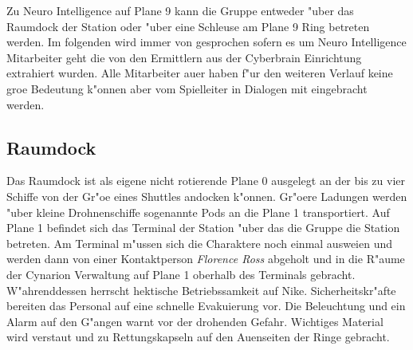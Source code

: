 






























Zu Neuro Intelligence auf Plane 9 kann die Gruppe entweder "uber das Raumdock der Station oder "uber eine Schleuse am Plane 9 Ring betreten werden. Im folgenden wird immer von \ml{} gesprochen sofern es um Neuro Intelligence Mitarbeiter geht die von den Ermittlern aus der Cyberbrain Einrichtung extrahiert wurden. Alle Mitarbeiter au\3er \ml{} haben f"ur den weiteren Verlauf keine gro\3e Bedeutung k"onnen aber vom Spielleiter in Dialogen mit eingebracht werden.

\subsection{Raumdock}
Das Raumdock ist als eigene nicht rotierende Plane 0 ausgelegt an der bis zu vier Schiffe von der Gr"o\3e eines Shuttles andocken k"onnen. Gr"o\3ere Ladungen werden "uber kleine Drohnenschiffe sogenannte Pods an die Plane 1 transportiert. Auf Plane 1 befindet sich das Terminal der Station "uber das die Gruppe die Station betreten. Am Terminal m"ussen sich die Charaktere noch einmal auswei\3en und werden dann von einer Kontaktperson \emph{Florence Ross} abgeholt und in die R"aume der Cynarion Verwaltung auf Plane 1 oberhalb des Terminals gebracht. W"ahrenddessen herrscht hektische Betriebssamkeit auf Nike. Sicherheitskr"afte bereiten das Personal auf eine schnelle Evakuierung vor. Die Beleuchtung und ein Alarm auf den G"angen warnt vor der drohenden Gefahr. Wichtiges Material wird verstaut und zu Rettungskapseln auf den Au\3enseiten der Ringe gebracht.

